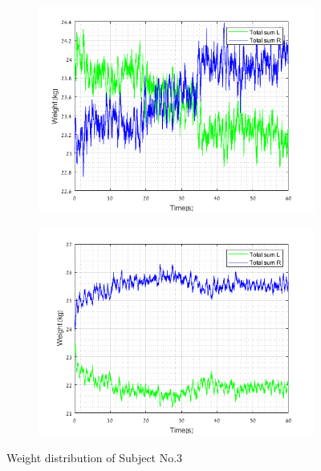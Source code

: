 \documentclass[twoside]{ctuthesis}
\theoremstyle{plain}
\theoremstyle{definition}
\theoremstyle{note}
\begin{document}
\begin{figure}[H]
	\centering
	\begin{subfigure}{\textwidth}
		\hspace*{-1cm}
		\includegraphics[scale=.9]{W_sub3_OE}
	\end{subfigure}\hfil
	\begin{subfigure}{\textwidth}
		\hspace*{-1cm}
		\includegraphics[scale=.9]{W_sub3_CE}
	\end{subfigure}
	\caption{Weight distribution of Subject No.3}
\end{figure}
\end{document}
